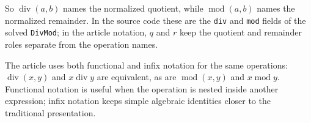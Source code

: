So $\operatorname{div}(a,b)$ names the normalized quotient, while
$\operatorname{mod}(a,b)$ names the normalized remainder. In the source code
these are the \texttt{div} and \texttt{mod} fields of the solved
\texttt{DivMod}; in the article notation, $q$ and $r$ keep the quotient and
remainder roles separate from the operation names.

The article uses both functional and infix notation for the same operations:
$\operatorname{div}(x,y)$ and $x \operatorname{div} y$ are equivalent, as are
$\operatorname{mod}(x,y)$ and $x \operatorname{mod} y$. Functional notation is
useful when the operation is nested inside another expression; infix notation
keeps simple algebraic identities closer to the traditional presentation.
